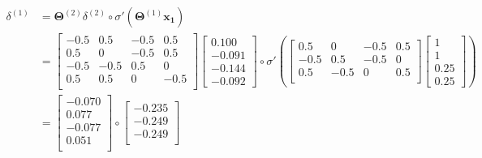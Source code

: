 \documentclass[a4paper, 10pt, twoside]{article}
\begin{document}
\begin{enumerate}[a)]
	      \begin{align*}
		      \delta^{(1)}
		       & = \bm{\Theta}^{(2)} \delta^{(2)} \circ \sigma' \left(\bm{\Theta}^{(1)} \bm{x_1} \right) \\
		       & =
		      \begin{bmatrix}
			      -0.5 & 0.5  & -0.5 & 0.5  \\
			      0.5  & 0    & -0.5 & 0.5  \\
			      -0.5 & -0.5 & 0.5  & 0    \\
			      0.5  & 0.5  & 0    & -0.5 \\
		      \end{bmatrix}
		      \begin{bmatrix}
			      0.100 \\ -0.091 \\ -0.144 \\ -0.092
		      \end{bmatrix}
		      \circ
		      \sigma'\left(
		      \begin{bmatrix}
				      0.5  & 0    & -0.5 & 0.5 \\
				      -0.5 & 0.5  & -0.5 & 0   \\
				      0.5  & -0.5 & 0    & 0.5 \\
			      \end{bmatrix}
		      \begin{bmatrix}
				      1 \\ 1 \\ 0.25 \\ 0.25
			      \end{bmatrix}
		      \right)                                                                                    \\
		       & =
		      \begin{bmatrix}
			      -0.070 \\
			      0.077  \\
			      -0.077 \\
			      0.051  \\
		      \end{bmatrix}
		      \circ
		      \begin{bmatrix}
			      -0.235 \\
			      -0.249 \\
			      -0.249 \\
		      \end{bmatrix}                                                                 \\
	      \end{align*}


\end{enumerate}
\end{document}
